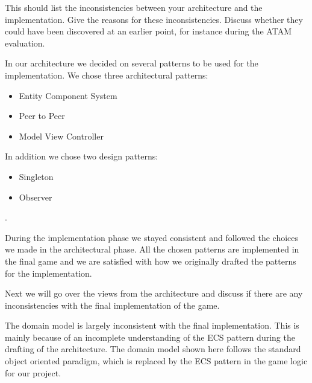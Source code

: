 
This should list the inconsistencies between your architecture and the implementation. Give the reasons for these inconsistencies. Discuss whether they could have been discovered at an earlier point, for instance during the ATAM evaluation.\\



In our architecture we decided on several patterns to be used for the implementation. We chose three architectural patterns: 
\begin{itemize}
	\item Entity Component System
	\item Peer to Peer
	\item Model View Controller
\end{itemize}

In addition we chose two design patterns:

\begin{itemize}
	\item Singleton
	\item Observer
\end{itemize} .

During the implementation phase we stayed consistent and followed the choices we made in the architectural phase. All the chosen patterns are implemented in the final game and we are satisfied with how we originally drafted the patterns for the implementation.

Next we will go over the views from the architecture and discuss if there are any inconsistencies with the final implementation of the game.



The domain model is largely inconsistent with the final implementation. This is mainly because of an incomplete understanding of the ECS pattern during the drafting of the architecture. The domain model shown here follows the standard object oriented paradigm, which is replaced by the ECS pattern in the game logic for our project.

